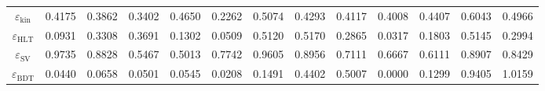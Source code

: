 \documentclass[10pt,a4paper]{article}
\begin{document}
\begin{landscape}
{\begin{tabular}{c|cccc|cccc|cccc}
\midrule
$\varepsilon_{\mathrm{kin}}$ & 0.4175 & 0.3862 & 0.3402 & 0.4650 & 0.2262 & 0.5074 & 0.4293 & 0.4117 & 0.4008 & 0.4407 & 0.6043 & 0.4966\\
$\varepsilon_{\mathrm{HLT}}$ & 0.0931 & 0.3308 & 0.3691 & 0.1302 & 0.0509 & 0.5120 & 0.5170 & 0.2865 & 0.0317 & 0.1803 & 0.5145 & 0.2994\\
$\varepsilon_{\mathrm{SV}}$ & 0.9735 & 0.8828 & 0.5467 & 0.5013 & 0.7742 & 0.9605 & 0.8956 & 0.7111 & 0.6667 & 0.6111 & 0.8907 & 0.8429\\
$\varepsilon_{\mathrm{BDT}}$ & 0.0440 & 0.0658 & 0.0501 & 0.0545 & 0.0208 & 0.1491 & 0.4402 & 0.5007 & 0.0000 & 0.1299 & 0.9405 & 1.0159\\
\bottomrule
\end{tabular}}

\end{landscape}
\clearpage
\end{document}
